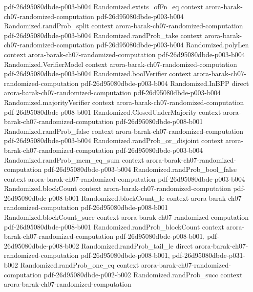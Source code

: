\begin{theorem}
  {pdf-26d95080dbde-p003-b004}
\proofstep
  {Randomized.exists_ofFn_eq}
  {context}
  {arora-barak-ch07-randomized-computation}
  {pdf-26d95080dbde-p003-b004}
\proofstep
  {Randomized.randProb_split}
  {context}
  {arora-barak-ch07-randomized-computation}
  {pdf-26d95080dbde-p003-b004}
\proofstep
  {Randomized.randProb_take}
  {context}
  {arora-barak-ch07-randomized-computation}
  {pdf-26d95080dbde-p003-b004}
\proofstep
  {Randomized.polyLen}
  {context}
  {arora-barak-ch07-randomized-computation}
  {pdf-26d95080dbde-p003-b004}
\proofstep
  {Randomized.VerifierModel}
  {context}
  {arora-barak-ch07-randomized-computation}
  {pdf-26d95080dbde-p003-b004}
\proofstep
  {Randomized.boolVerifier}
  {context}
  {arora-barak-ch07-randomized-computation}
  {pdf-26d95080dbde-p003-b004}
\proofstep
  {Randomized.InBPP}
  {direct}
  {arora-barak-ch07-randomized-computation}
  {pdf-26d95080dbde-p003-b004}
\proofstep
  {Randomized.majorityVerifier}
  {context}
  {arora-barak-ch07-randomized-computation}
  {pdf-26d95080dbde-p008-b001}
\proofstep
  {Randomized.ClosedUnderMajority}
  {context}
  {arora-barak-ch07-randomized-computation}
  {pdf-26d95080dbde-p008-b001}
\proofstep
  {Randomized.randProb_false}
  {context}
  {arora-barak-ch07-randomized-computation}
  {pdf-26d95080dbde-p003-b004}
\proofstep
  {Randomized.randProb_or_disjoint}
  {context}
  {arora-barak-ch07-randomized-computation}
  {pdf-26d95080dbde-p003-b004}
\proofstep
  {Randomized.randProb_mem_eq_sum}
  {context}
  {arora-barak-ch07-randomized-computation}
  {pdf-26d95080dbde-p003-b004}
\proofstep
  {Randomized.randProb_bool_false}
  {context}
  {arora-barak-ch07-randomized-computation}
  {pdf-26d95080dbde-p003-b004}
\proofstep
  {Randomized.blockCount}
  {context}
  {arora-barak-ch07-randomized-computation}
  {pdf-26d95080dbde-p008-b001}
\proofstep
  {Randomized.blockCount_le}
  {context}
  {arora-barak-ch07-randomized-computation}
  {pdf-26d95080dbde-p008-b001}
\proofstep
  {Randomized.blockCount_succ}
  {context}
  {arora-barak-ch07-randomized-computation}
  {pdf-26d95080dbde-p008-b001}
\proofstep
  {Randomized.randProb_blockCount}
  {context}
  {arora-barak-ch07-randomized-computation}
  {pdf-26d95080dbde-p008-b001,
    pdf-26d95080dbde-p008-b002}
\proofstep
  {Randomized.randProb_tail_le}
  {direct}
  {arora-barak-ch07-randomized-computation}
  {pdf-26d95080dbde-p008-b001,
    pdf-26d95080dbde-p031-b002}
\proofstep
  {Randomized.randProb_one_eq}
  {context}
  {arora-barak-ch07-randomized-computation}
  {pdf-26d95080dbde-p002-b002}
\proofstep
  {Randomized.randProb_succ}
  {context}
  {arora-barak-ch07-randomized-computation}

\end{theorem}
